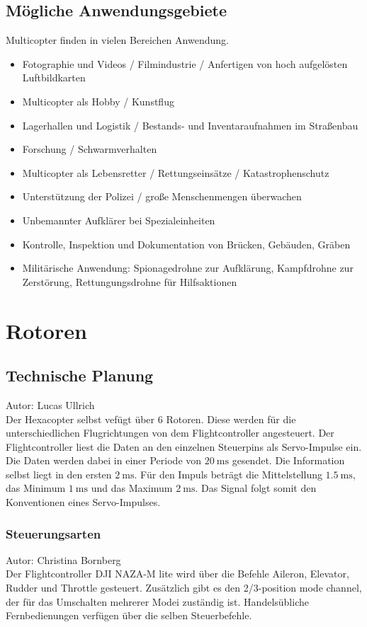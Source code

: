   \subsection{Mögliche Anwendungsgebiete}
  Multicopter finden in vielen Bereichen Anwendung\cite{copterAnwendung}. 
  \begin{itemize}
    \item Fotographie und Videos / Filmindustrie / Anfertigen von hoch aufgelösten Luftbildkarten
    \item Multicopter als Hobby / Kunstflug
    \item Lagerhallen und Logistik / Bestands- und Inventaraufnahmen im Straßenbau
    \item Forschung / Schwarmverhalten
    \item Multicopter als Lebensretter / Rettungseinsätze / Katastrophenschutz
    \item Unterstützung der Polizei / große Menschenmengen überwachen
    \item Unbemannter Aufklärer bei Spezialeinheiten
    \item Kontrolle, Inspektion und Dokumentation von Brücken, Gebäuden, Gräben
    \item Militärische Anwendung: Spionagedrohne zur Aufklärung, Kampfdrohne zur Zerstörung, Rettungungsdrohne für Hilfsaktionen
  \end{itemize}


\section{Rotoren}

  \subsection{Technische Planung}
  Autor: Lucas Ullrich\\
  Der Hexacopter selbst vefügt über 6 Rotoren. Diese werden für die unterschiedlichen Flugrichtungen von dem Flightcontroller angesteuert.
  Der Flightcontroller liest die Daten an den einzelnen Steuerpins als Servo-Impulse ein. Die Daten werden dabei in einer Periode von $\SI{20}{\milli\second}$ gesendet.
  Die Information selbst liegt in den ersten $\SI{2}{\milli\second}$. Für den Impuls beträgt die Mittelstellung $\SI{1.5}{\milli\second}$, das Minimum $\SI{1}{\milli\second}$
  und das Maximum $\SI{2}{\milli\second}$. Das Signal folgt somit den Konventionen eines Servo-Impulses.

    \subsubsection{Steuerungsarten}
    Autor: Christina Bornberg\\
    Der Flightcontroller DJI NAZA-M lite wird über die Befehle\cite{GrundlagenMulticopter} Aileron, Elevator, Rudder und Throttle gesteuert. Zusätzlich gibt es den 2/3-position mode channel, der für das Umschalten mehrerer Modei zuständig ist. Handelsübliche Fernbedienungen verfügen über die selben Steuerbefehle. 

